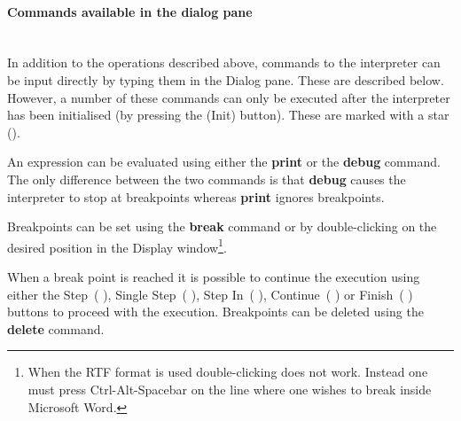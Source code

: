 \documentclass[\pformat,12pt]{article}
\newcommand{\subsubsubsection}[1]{\paragraph{#1}\mbox{}\\}
\newcommand{\guicmd}[1]{{\sf #1}}
\begin{document}
\subsubsubsection{Commands available in the dialog pane}

In addition to the operations described above, commands to the
interpreter can be input directly by typing them in the
\guicmd{Dialog} pane. These are described below. However, a number of
these commands can only be executed after the interpreter has
been initialised (by pressing the
(\guicmd{Init}) button).  These are
marked with a star ({\tt *}).

An expression can be evaluated using either the
\textbf{print} or the
\textbf{debug} command.  The only difference
between the two commands 
is that {\bf debug} causes the interpreter to stop at breakpoints
whereas {\bf print} ignores breakpoints.

Breakpoints can be set using the \textbf{break} command
 or by 
double-clicking on the desired position in the \guicmd{Display}
window\footnote{When the RTF format is used double-clicking does not
work. Instead one must press Ctrl-Alt-Spacebar on the line where one
wishes to break inside Microsoft Word.}.

When a break point is reached
it is possible to continue the execution using either the
\guicmd{Step}~(\hspace{-1.8mm}
),
\guicmd{Single Step}~(\hspace{-1.8mm} 
),
\guicmd{Step In}~(\hspace{-1.8mm}
),
\guicmd{Continue}~(\hspace{-1.8mm}
)
or \guicmd{Finish}~(\hspace{-1.8mm} 
)
buttons to proceed with the execution. Breakpoints can be deleted
using the \textbf{delete} command. 
\end{document}
